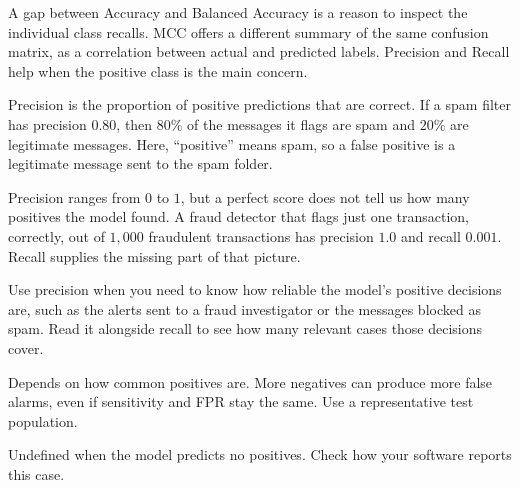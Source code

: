 \metricsecondary

A gap between Accuracy and Balanced Accuracy is a reason to inspect the individual class recalls. MCC offers a different summary of the same confusion matrix, as a correlation between actual and predicted labels. Precision and Recall help when the positive class is the main concern.

\metricend
\clearpage
\thispagestyle{classificationstyle}
\label{sec:precision}

Precision is the proportion of positive predictions that are correct. If a spam filter has precision $0.80$, then $80\%$ of the messages it flags are spam and $20\%$ are legitimate messages. Here, ``positive'' means spam, so a false positive is a legitimate message sent to the spam folder.

\begin{metricformula}
\end{metricformula}

Precision ranges from $0$ to $1$, but a perfect score does not tell us how many positives the model found. A fraud detector that flags just one transaction, correctly, out of $1{,}000$ fraudulent transactions has precision $1.0$ and recall $0.001$. Recall supplies the missing part of that picture.


Use precision when you need to know how reliable the model's positive decisions are, such as the alerts sent to a fraud investigator or the messages blocked as spam. Read it alongside recall to see how many relevant cases those decisions cover.

{
\item Depends on how common positives are. More negatives can produce more false alarms, even if sensitivity and FPR stay the same. Use a representative test population.
\item Undefined when the model predicts no positives. Check how your software reports this case.
}

